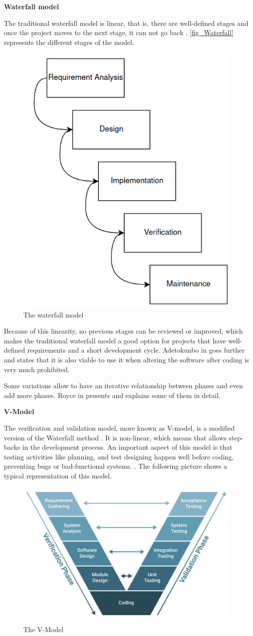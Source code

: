 \textbf{Waterfall model}
\newline

The traditional waterfall model is linear, that is, there are well-defined stages and once the project moves to the next stage, it can not go back \cite{waterfallModel}. \autoref{fig_Waterfall} represents the different stages of the model. 

\begin{figure}[H]
	\centering
 	\includegraphics[width=0.4\linewidth]{Images/Waterfall.png}
 	\caption{The waterfall model}
	 \label{fig_Waterfall}
\end{figure}

Because of this linearity, no previous stages can be reviewed or improved, which makes the traditional waterfall model a good option for projects that have well-defined requirements and a short development cycle. Adetokunbo in \cite{waterfallModel} goes further and states that it is also viable to use it when altering the software after coding is very much prohibited.

Some variations allow to have an iterative relationship between phases and even add more phases. Royce in \cite{royce1970winston} presents and explains some of them in detail. 
\newline

\textbf{V-Model}
\newline

The verification and validation model, more known as V-model, is a modified version of the Waterfall method \cite{V-model}. It is non-linear, which means that allows step-backs in the development process. An important aspect of this model is that testing activities like planning, and test designing happen well before coding, preventing bugs or bad-functional systems. \cite{V-model2}. The following picture shows a typical representation of this model.

\begin{figure}[H]
	\centering
 	\includegraphics[width=0.5\linewidth]{Images/V-Model.png}
 	\caption{The V-Model}
	 \label{fig_V-Model}
\end{figure}

